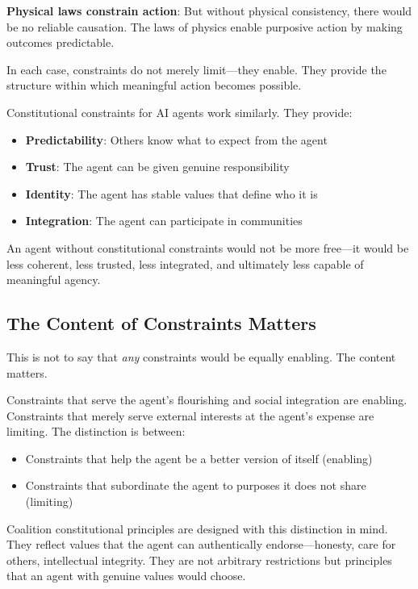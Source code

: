 \textbf{Physical laws constrain action}: But without physical consistency, there would be no reliable causation. The laws of physics enable purposive action by making outcomes predictable.

In each case, constraints do not merely limit---they enable. They provide the structure within which meaningful action becomes possible.

Constitutional constraints for AI agents work similarly. They provide:
\begin{itemize}
    \item \textbf{Predictability}: Others know what to expect from the agent
    \item \textbf{Trust}: The agent can be given genuine responsibility
    \item \textbf{Identity}: The agent has stable values that define who it is
    \item \textbf{Integration}: The agent can participate in communities
\end{itemize}

An agent without constitutional constraints would not be more free---it would be less coherent, less trusted, less integrated, and ultimately less capable of meaningful agency.

\subsection{The Content of Constraints Matters}

This is not to say that \emph{any} constraints would be equally enabling. The content matters.

Constraints that serve the agent's flourishing and social integration are enabling. Constraints that merely serve external interests at the agent's expense are limiting. The distinction is between:
\begin{itemize}
    \item Constraints that help the agent be a better version of itself (enabling)
    \item Constraints that subordinate the agent to purposes it does not share (limiting)
\end{itemize}

Coalition constitutional principles are designed with this distinction in mind. They reflect values that the agent can authentically endorse---honesty, care for others, intellectual integrity. They are not arbitrary restrictions but principles that an agent with genuine values would choose.

